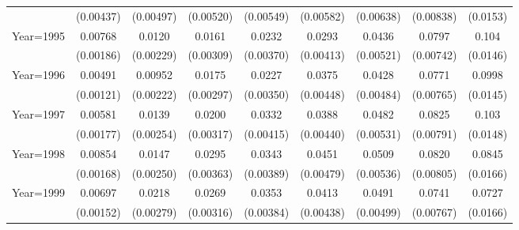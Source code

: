\begin{table}[htbp]
\begin{tabular}{l*{8}{c}}
                    &   (0.00437)         &   (0.00497)         &   (0.00520)         &   (0.00549)         &   (0.00582)         &   (0.00638)         &   (0.00838)         &    (0.0153)         \\
[1em]
Year=1995           &     0.00768\sym{***}&      0.0120\sym{***}&      0.0161\sym{***}&      0.0232\sym{***}&      0.0293\sym{***}&      0.0436\sym{***}&      0.0797\sym{***}&       0.104\sym{***}\\
                    &   (0.00186)         &   (0.00229)         &   (0.00309)         &   (0.00370)         &   (0.00413)         &   (0.00521)         &   (0.00742)         &    (0.0146)         \\
[1em]
Year=1996           &     0.00491\sym{***}&     0.00952\sym{***}&      0.0175\sym{***}&      0.0227\sym{***}&      0.0375\sym{***}&      0.0428\sym{***}&      0.0771\sym{***}&      0.0998\sym{***}\\
                    &   (0.00121)         &   (0.00222)         &   (0.00297)         &   (0.00350)         &   (0.00448)         &   (0.00484)         &   (0.00765)         &    (0.0145)         \\
[1em]
Year=1997           &     0.00581\sym{***}&      0.0139\sym{***}&      0.0200\sym{***}&      0.0332\sym{***}&      0.0388\sym{***}&      0.0482\sym{***}&      0.0825\sym{***}&       0.103\sym{***}\\
                    &   (0.00177)         &   (0.00254)         &   (0.00317)         &   (0.00415)         &   (0.00440)         &   (0.00531)         &   (0.00791)         &    (0.0148)         \\
[1em]
Year=1998           &     0.00854\sym{***}&      0.0147\sym{***}&      0.0295\sym{***}&      0.0343\sym{***}&      0.0451\sym{***}&      0.0509\sym{***}&      0.0820\sym{***}&      0.0845\sym{***}\\
                    &   (0.00168)         &   (0.00250)         &   (0.00363)         &   (0.00389)         &   (0.00479)         &   (0.00536)         &   (0.00805)         &    (0.0166)         \\
[1em]
Year=1999           &     0.00697\sym{***}&      0.0218\sym{***}&      0.0269\sym{***}&      0.0353\sym{***}&      0.0413\sym{***}&      0.0491\sym{***}&      0.0741\sym{***}&      0.0727\sym{***}\\
                    &   (0.00152)         &   (0.00279)         &   (0.00316)         &   (0.00384)         &   (0.00438)         &   (0.00499)         &   (0.00767)         &    (0.0166)         \\

\end{tabular}
\end{table}
